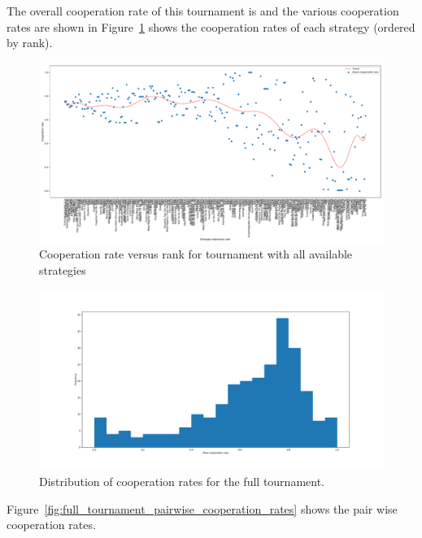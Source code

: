 \documentclass{article}
\begin{document}
The overall cooperation rate of this tournament is
and the various
cooperation rates are shown in
Figure~\ref{fig:full_tournament_cooperation_rate_versus_rank} shows the
cooperation rates of each strategy (ordered by rank).

\begin{figure}[!hbtp]
    \centering
    \includegraphics[width=.8\textwidth]{assets/full_tournament_cooperation_rate_versus_rank.pdf}
    \caption{Cooperation rate versus rank for tournament with all available
    strategies}
    \label{fig:full_tournament_cooperation_rate_versus_rank}
\end{figure}

\begin{figure}[!hbtp]
    \centering
    \includegraphics[width=.8\textwidth]{assets/full_tournament_cooperation_rates.pdf}
    \caption{Distribution of cooperation rates for the full tournament.}
    \label{fig:full_tournament_cooperation_rates}
\end{figure}

Figure~\ref{fig:full_tournament_pairwise_cooperation_rates} shows the pair wise
cooperation rates.
\end{document}
